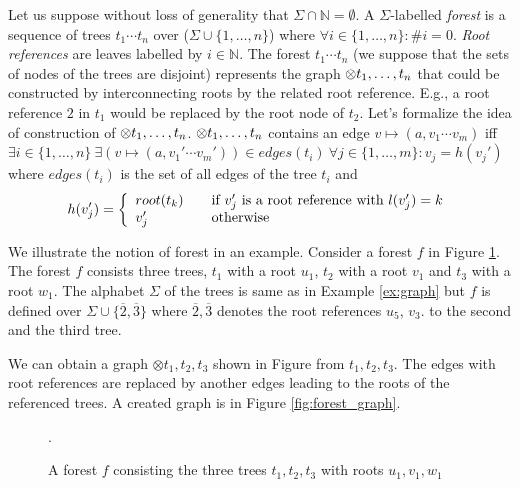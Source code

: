 Let us suppose without loss of generality that $\Sigma \cap \mathbb{N} = \emptyset$.
A $\Sigma$-labelled \emph{forest} is a sequence of trees $t_1 \cdots t_n$ over ($\Sigma \cup \{1,\ldots,n\}$)
where $\forall i \in \{1,\ldots,n\}: \#i = 0$.
\emph{Root references} are leaves labelled by $i \in \mathbb{N}$.
The forest $t_1 \cdots t_n$ (we suppose that the sets of nodes of the trees are disjoint) represents the graph $\otimes t_1, \ldots, t_n$ that could
be constructed by interconnecting roots by the related root reference.
E.g., a root reference $2$ in $t_1$ would be replaced by the root node of $t_2$.
Let's formalize the idea of construction of $\otimes t_1, \ldots, t_n$.
$\otimes t_1, \ldots, t_n$ contains an edge $v \mapsto (a,v_1 \cdots v_m)$ iff $\exists i \in \{1, \ldots, n\} \ \exists(v \mapsto (a, v_1' \cdots v_m')) \in edges(t_i)
\ \forall j \in \{1,\ldots,m\}: v_j = h(v_j')$ where $edges(t_i)$ is the set of all edges of the tree $t_i$ and
\[ h(v_j') = \left\{
  \begin{array}{l l}
  root(t_k) & \quad \text{if $v_j'$ is a root reference with $l(v_j') = k$}\\
  v_j'   & \quad \text{otherwise}
  \end{array} \right.\]

\pagebreak
\bexmp
We illustrate the notion of forest in an example.
Consider a forest $f$ in Figure \ref{fig:forest}.
The forest $f$ consists three trees, $t_1$ with a root $u_1$,
$t_2$ with a root $v_1$ and $t_3$ with a root $w_1$.
The alphabet $\Sigma$ of the trees is same as in Example \ref{ex:graph} but $f$
is defined over $\Sigma \cup \{\overline{2}, \overline{3}\}$
where $\overline{2}, \overline{3}$ denotes the root references $u_5$, $v_3$.
to the second and the third tree.

We can obtain a graph $\otimes t_1,t_2,t_3$ shown in Figure from $t_1, t_2, t_3$.
The edges with root references are replaced by another edges leading to the roots
of the referenced trees.
A created graph is in Figure \ref{fig:forest_graph}.

	\begin{figure}[bth]
	\begin{center}
		\scalebox{1}
		{
			
			\hspace{0.55cm}
			
			\hspace{0.55cm}
			
		}
		\caption{A forest $f$ consisting the three trees $t_1, t_2, t_3$ with roots $u_1, v_1, w_1$}.
	  \label{fig:forest}
	\end{center}
	\end{figure}

